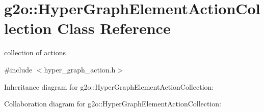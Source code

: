 \hypertarget{classg2o_1_1HyperGraphElementActionCollection}{}\section{g2o\+:\+:Hyper\+Graph\+Element\+Action\+Collection Class Reference}
\label{classg2o_1_1HyperGraphElementActionCollection}


collection of actions  




{\ttfamily \#include $<$hyper\+\_\+graph\+\_\+action.\+h$>$}



Inheritance diagram for g2o\+:\+:Hyper\+Graph\+Element\+Action\+Collection\+:


Collaboration diagram for g2o\+:\+:Hyper\+Graph\+Element\+Action\+Collection\+:
